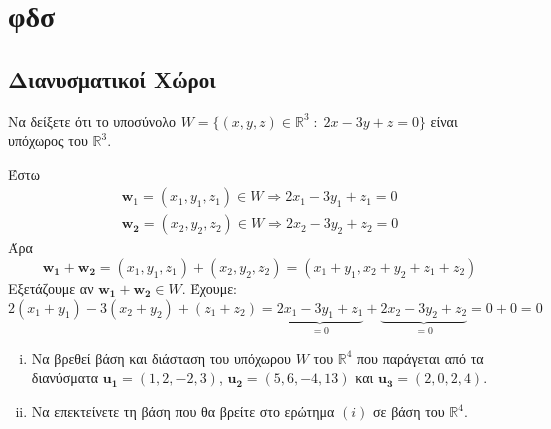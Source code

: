 





\chapter{φδσ}

\section{Διανυσματικοί Χώροι}





\begin{exercise}
    Να δείξετε ότι το υποσύνολο $ W = \{(x,y,z)\in \mathbb{R}^{3} \; : 
    \; 2x-3y+z=0 \} $ είναι υπόχωρος του $ \mathbb{R}^{3} $.
\end{exercise}

\begin{solution}
\item {}
    Έστω 
    \begin{align*}
        \mathbf{w}_{1} = (x_{1}, y_{1}, z_{1}) \in W 
        \Rightarrow  2 x_{1} - 3 y_{1} + z_{1} = 0 \\
        \mathbf{w_{2}} = (x_{2}, y_{2}, z_{2}) \in W 
        \Rightarrow 2 x_{2} - 3 y_{2} + z_{2} = 0
    \end{align*} 
    Άρα 
    \[
        \mathbf{w_{1}}+ \mathbf{w_{2}} = (x_{1}, y_{1}, z_{1}) + 
        (x_{2}, y_{2}, z_{2}) = (x_{1}+ y_{1}, x_{2}+ y_{2}+ z_{1} + z_{2})
    \] 
    Εξετάζουμε αν $ \mathbf{w_{1}}+ \mathbf{w_{2}} \in W $. Έχουμε:
    \[
        2 (x_{1}+ y_{1}) -3 (x_{2}+ y_{2}) + (z_{1}+ z_{2}) = 
        \underbrace{2 x_{1} - 3 y_{1} + z_{1}}_{=0} + 
        \underbrace{2 x_{2}- 3 y_{2} + z_{2}}_{=0} = 0 + 0 = 0 
    \] 
\end{solution}

\begin{example}
  \begin{enumerate}[i)]
    \item 
  Να βρεθεί βάση και διάσταση του υπόχωρου $W$ του $ \mathbb{R}^{4} $ που παράγεται 
  από τα διανύσματα $ \mathbf{u_{1}} = (1,2,-2,3) $, $ \mathbf{u_{2}} = (5,6,-4,13) $ 
  και $ \mathbf{u_{3}} = (2,0,2,4) $. 
\item 
  Να επεκτείνετε τη βάση που θα βρείτε στο ερώτημα $ (i) $ σε βάση του $ \mathbb{R}^{4} $.
  \end{enumerate}

\end{example}


